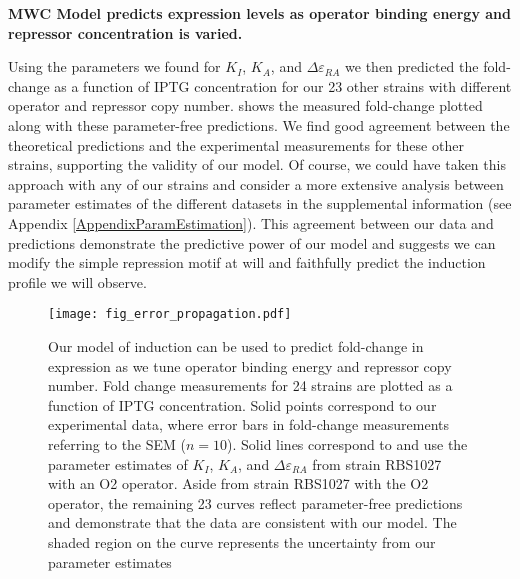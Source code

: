 \noindent \textbf{MWC Model predicts expression levels as operator binding energy and repressor concentration is varied.}

Using the parameters we found for $K_I$, $K_A$, and $\Delta\varepsilon_{RA}$ we
then predicted the fold-change as a function of IPTG concentration for our 23
other strains with different operator and repressor copy number.
 shows the measured fold-change plotted along with these
parameter-free predictions. We find good agreement between the theoretical
predictions and the experimental measurements for these other strains,
supporting the validity of our model. Of course, we could have taken this
approach with any of our strains and consider a more extensive analysis between
parameter estimates of the different datasets in the supplemental information
(see Appendix \ref{AppendixParamEstimation}). This agreement between our data
and predictions demonstrate the predictive power of our model and suggests we
can modify the simple repression motif at will and faithfully predict the
induction profile we will observe. %


\begin{figure}[h]
	\centering
	\texttt{[image: fig\_error\_propagation.pdf]}
	\caption{Our model of induction can be used to predict fold-change in expression as we tune operator binding energy and repressor copy number. \tiny{ } Fold
		change measurements for 24 strains are plotted as a function of IPTG concentration. Solid points
		correspond to our experimental data, where error bars in fold-change
		measurements referring to the SEM ($n=10$). Solid lines correspond to
		\eref[eq7] and use the parameter estimates of $K_I$, $K_A$, and $\Delta\varepsilon_{RA}$ from
		strain RBS1027 with an O2 operator. Aside from strain RBS1027 with the O2
		operator, the remaining 23 curves reflect parameter-free predictions and
		demonstrate that the data are consistent with our model. The shaded region on
		the curve represents the uncertainty from our parameter estimates}
		\label{fig_result2}
\end{figure}

